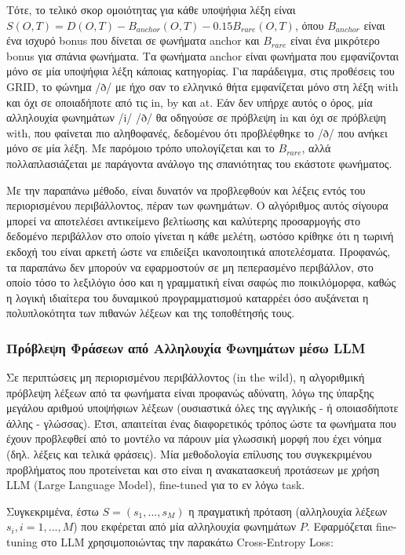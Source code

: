 Τότε, το τελικό σκορ ομοιότητας για κάθε υποψήφια λέξη είναι $S(O,T) = D(O,T) - B_{anchor}(O,T) -0.15 B_{rare}(O,T)$, όπου $B_{anchor}$ είναι ένα ισχυρό bonus που δίνεται σε φωνήματα anchor και $B_{rare}$ είναι ένα μικρότερο bonus για σπάνια φωνήματα. Τα φωνήματα anchor είναι φωνήματα που εμφανίζονται μόνο σε μία υποψήφια λέξη κάποιας κατηγορίας. Για παράδειγμα, στις προθέσεις του GRID, το φώνημα /ð/ με ήχο σαν το ελληνικό θήτα εμφανίζεται μόνο στη λέξη with και όχι σε οποιαδήποτε από τις in, by και at. Εάν δεν υπήρχε αυτός ο όρος, μία αλληλουχία φωνημάτων /i/ /ð/ θα οδηγούσε σε πρόβλεψη in και όχι σε πρόβλεψη with, που φαίνεται πιο αληθοφανές, δεδομένου ότι προβλέφθηκε το /ð/ που ανήκει μόνο σε μία λέξη. Με παρόμοιο τρόπο υπολογίζεται και το $B_{rare}$, αλλά πολλαπλασιάζεται με παράγοντα ανάλογο της σπανιότητας του εκάστοτε φωνήματος.

Με την παραπάνω μέθοδο, είναι δυνατόν να προβλεφθούν και λέξεις εντός του περιορισμένου περιβάλλοντος, πέραν των φωνημάτων. Ο αλγόριθμος αυτός σίγουρα μπορεί να αποτελέσει αντικείμενο βελτίωσης και καλύτερης προσαρμογής στο δεδομένο περιβάλλον στο οποίο γίνεται η κάθε μελέτη, ωστόσο κρίθηκε ότι η τωρινή εκδοχή του είναι αρκετή ώστε να επιδείξει ικανοποιητικά αποτελέσματα. Προφανώς, τα παραπάνω δεν μπορούν να εφαρμοστούν σε μη πεπερασμένο περιβάλλον, στο οποίο τόσο το λεξιλόγιο όσο και η γραμματική είναι σαφώς πιο ποικιλόμορφα, καθώς η λογική ιδιαίτερα του δυναμικού προγραμματισμού καταρρέει όσο αυξάνεται η πολυπλοκότητα των πιθανών λέξεων και της τοποθέτησής τους.

\subsubsection{Πρόβλεψη Φράσεων από Αλληλουχία Φωνημάτων μέσω LLM}
\label{PhrasePrediction}
Σε περιπτώσεις μη περιορισμένου περιβάλλοντος (in the wild), η αλγοριθμική πρόβλεψη λέξεων από τα φωνήματα είναι προφανώς αδύνατη, λόγω της ύπαρξης μεγάλου αριθμού υποψήφιων λέξεων (ουσιαστικά όλες της αγγλικής - ή οποιασδήποτε άλλης - γλώσσας). Έτσι, απαιτείται ένας διαφορετικός τρόπος ώστε τα φωνήματα που έχουν προβλεφθεί από το μοντέλο να πάρουν μία γλωσσική μορφή που έχει νόημα (δηλ. λέξεις και τελικά φράσεις). Μία μεθοδολογία επίλυσης του συγκεκριμένου προβλήματος που προτείνεται και στο \cite{thomas2026vallrvisualasrlanguage} είναι η ανακατασκευή προτάσεων με χρήση LLM (Large Language Model), fine-tuned για το εν λόγω task.

Συγκεκριμένα, έστω $S = (s_1, ..., s_M)$ η πραγματική πρόταση (αλληλουχία λέξεων $s_i, i=1,...,M$) που εκφέρεται από μία αλληλουχία φωνημάτων $P$. Εφαρμόζεται fine-tuning στο LLM χρησιμοποιώντας την παρακάτω Cross-Entropy Loss:

